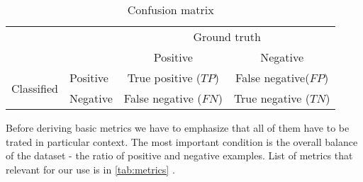 \begin{table}[h]
    \centering
    \caption{Confusion matrix}
        \begin{tabular}{l|l|c|c|}
        \multicolumn{2}{c}{}&\multicolumn{2}{c}{Ground truth}\\
        \cline{3-4}
        \multicolumn{2}{c|}{}&Positive&Negative\\
        \cline{2-4}
        \multirow{2}{*}{Classified}& Positive & True positive ($TP$) & False negative($FP$)\\
        \cline{2-4}
        & Negative & False negative ($FN$) & True negative ($TN$)\\
        \cline{2-4}
        \end{tabular}
    \label{tab:confmatrix}
  \end{table}

Before deriving basic metrics we have to emphasize that all of them have to be trated in particular context. The most important condition is the overall balance of the dataset - the ratio of positive and negative examples. List of metrics that relevant for our use is in \ref{tab:metrics} .

